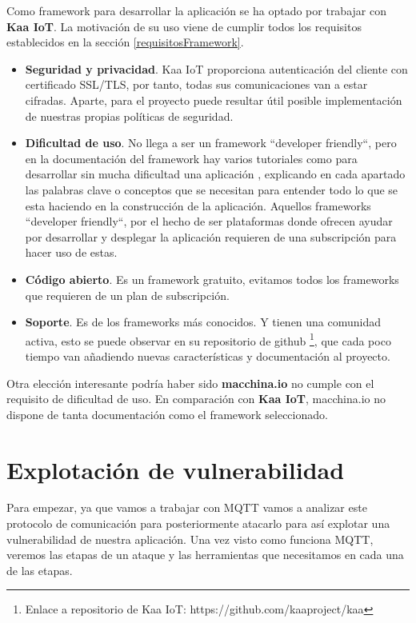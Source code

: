 {Como framework para desarrollar la aplicación se ha optado por trabajar con \textbf{Kaa IoT}. La motivación de su uso viene de cumplir todos los requisitos establecidos en la sección \ref{requisitosFramework}.

\begin{itemize}
    \item \textbf{Seguridad y privacidad}. Kaa IoT proporciona autenticación del cliente con certificado SSL/TLS, por tanto, todas sus comunicaciones van a estar cifradas. Aparte, para el proyecto puede resultar útil posible implementación de nuestras propias políticas de seguridad.
    \item \textbf{Dificultad de uso}. No llega a ser un framework ``developer friendly``, pero en la documentación del framework \cite{kaaiot} hay varios tutoriales como para desarrollar sin mucha dificultad una aplicación , explicando en cada apartado las palabras clave o conceptos que se necesitan para entender todo lo que se esta haciendo en la construcción de la aplicación. Aquellos frameworks ``developer friendly``, por el hecho de ser plataformas donde ofrecen ayudar por desarrollar y desplegar la aplicación requieren de una subscripción para hacer uso de estas.
    \item \textbf{Código abierto}. Es un framework gratuito, evitamos todos los frameworks que requieren de un plan de subscripción.
    \item \textbf{Soporte}. Es de los frameworks más conocidos. Y tienen una comunidad activa, esto se puede observar en su repositorio de github \footnote{Enlace a repositorio de Kaa IoT: https://github.com/kaaproject/kaa}, que cada poco tiempo van añadiendo nuevas características y documentación al proyecto.
\end{itemize}


Otra elección interesante podría haber sido \textbf{macchina.io} no cumple con el requisito de dificultad de uso. En comparación con \textbf{Kaa IoT}, macchina.io no dispone de tanta documentación como el framework seleccionado.


\section{Explotación de vulnerabilidad} \label{exploit-analysis}

Para empezar, ya que vamos a trabajar con MQTT vamos a analizar este protocolo de comunicación para posteriormente atacarlo para así explotar una vulnerabilidad de nuestra aplicación. Una vez visto como funciona MQTT, veremos las etapas de un ataque y las herramientas que necesitamos en cada una de las etapas.

}

